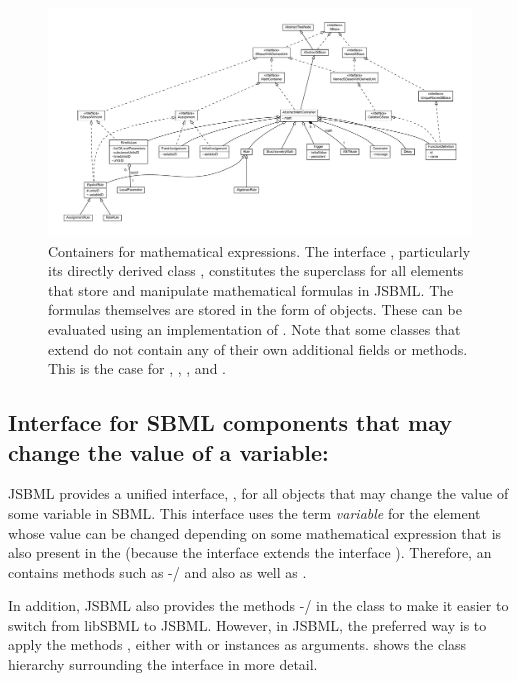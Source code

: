 \begin{figure}
 \centering
 \includegraphics[width=\textwidth]{../common/img/MathContainer.pdf}
 \caption[Containers for mathematical expressions]{Containers for
   mathematical expressions. The interface \MathContainer, particularly its
   directly derived class \AbstractMathContainer, constitutes the
   superclass for all elements that store and manipulate mathematical
   formulas in JSBML.  The formulas themselves are stored in the form of
   \ASTNode objects. These can be evaluated using an implementation of
   \ASTNodeCompiler. Note that some classes that extend
   \AbstractMathContainer do not contain any of their own additional fields
   or methods.  This is the case for \Delay, \Priority, \StoichiometryMath,
   and \AlgebraicRule.}
 \label{fig:MathContainerHierarchy}
\end{figure}


\subsection{Interface for SBML components that may change the value of
  a variable: }
\label{sec:assignment-interface}

JSBML provides a unified interface, \Assignment, for all objects that may
change the value of some variable in SBML.  This interface uses
the term \emph{variable} for the element whose value can be changed
depending on some mathematical expression that is also present in the
\Assignment (because the interface \Assignment extends the interface
\MathContainer).  Therefore, an  contains methods such as
-/ and also 
as well as .

In addition, JSBML also provides the methods
-/ in the \InitialAssignment class
to make it easier to switch from libSBML to JSBML.  However, in JSBML, the
preferred way  is to apply the
methods , either with \String or \Variable instances as
arguments.   shows the class
hierarchy surrounding the \Assignment interface in more detail.
